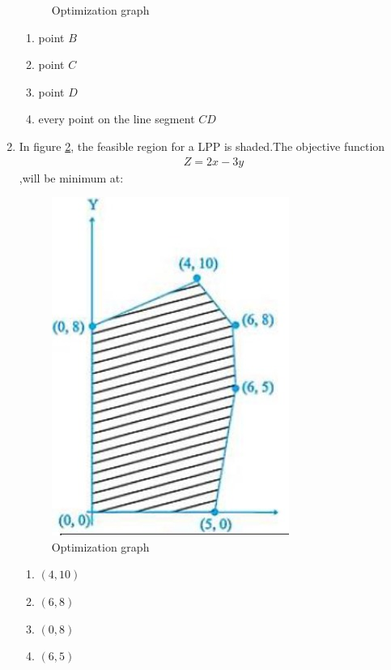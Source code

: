 \begin{enumerate}
\begin{figure}[h]
	\caption{Optimization graph}
    \label{fig:19/2021/041}
\end{figure}
\begin{enumerate}
    \item point $B$
    \item point $C$
    \item point $D$
    \item every point on the line segment $CD$   
\end{enumerate}
\item In figure \ref{fig:23/2021/041}, the feasible region for a LPP is shaded.The objective function 
\begin{align}
	Z=2x-3y
\end{align}
		,will be minimum at:
\begin{figure}[h]
    \centering{}
     \includegraphics[width=\columnwidth]{figs/opti-21-fig2.jpg}
	\caption{Optimization graph}
     \label{fig:23/2021/041}                       
\end{figure}
\begin{enumerate}
    \item $(4,10)$
    \item $(6,8)$
    \item $(0,8)$
    \item $(6,5)$
\end{enumerate}
    
\end{enumerate}

